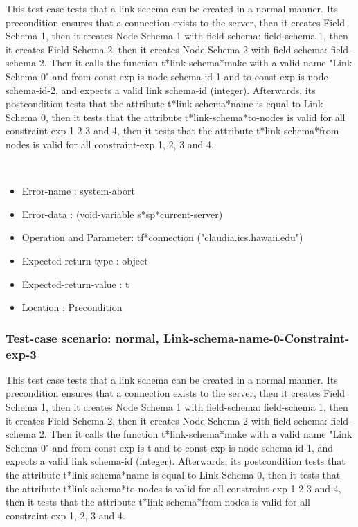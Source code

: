 This test case tests that a link schema can be created in a normal manner.
Its precondition ensures that a connection exists to the server, then it creates Field Schema 1, then it creates Node Schema 1 with field-schema: field-schema 1, then it creates Field Schema 2, then it creates Node Schema 2 with field-schema: field-schema 2.
Then it calls the function t*link-schema*make  with a valid name "Link Schema 0" and from-const-exp is node-schema-id-1 and to-const-exp is node-schema-id-2, and expects a valid link schema-id (integer).
Afterwards, its postcondition tests that the attribute t*link-schema*name is equal to Link Schema 0, then it tests that the attribute t*link-schema*to-nodes is valid for all constraint-exp 1 2 3 and 4, then it tests that the attribute t*link-schema*from-nodes is valid for all constraint-exp 1, 2, 3 and 4.


\
\begin {itemize}
\item 	Error-name             : system-abort
\item Error-data             : (void-variable s*sp*current-server)
\item Operation and Parameter: tf*connection ("claudia.ics.hawaii.edu")
\item Expected-return-type   : object
\item Expected-return-value  : t
\item Location               : Precondition



\end {itemize}
\subsubsection {Test-case scenario: normal, Link-schema-name-0-Constraint-exp-3}


This test case tests that a link schema can be created in a normal manner.
Its precondition ensures that a connection exists to the server, then it creates Field Schema 1, then it creates Node Schema 1 with field-schema: field-schema 1, then it creates Field Schema 2, then it creates Node Schema 2 with field-schema: field-schema 2.
Then it calls the function t*link-schema*make  with a valid name "Link Schema 0" and from-const-exp is t and to-const-exp is node-schema-id-1, and expects a valid link schema-id (integer).
Afterwards, its postcondition tests that the attribute t*link-schema*name is equal to Link Schema 0, then it tests that the attribute t*link-schema*to-nodes is valid for all constraint-exp 1 2 3 and 4, then it tests that the attribute t*link-schema*from-nodes is valid for all constraint-exp 1, 2, 3 and 4.


